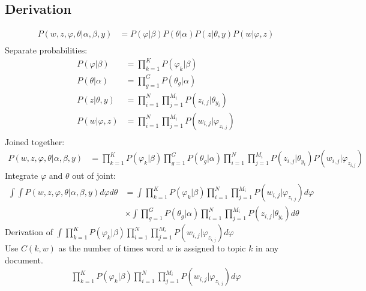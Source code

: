 \subsection{Derivation}\label{ref:derivation}
\begin{align}
P(w, z, \varphi, \theta | \alpha, \beta, y) &= P(\varphi | \beta)P(\theta | \alpha)P(z | \theta, y)P(w | \varphi, z)\\
\end{align}
Separate probabilities:
\begin{align}
P(\varphi | \beta) &= \prod\limits_{k=1}^K P(\varphi_k|\beta)\\
P(\theta | \alpha) &= \prod\limits_{g=1}^G P(\theta_g|\alpha)\\
P(z | \theta, y) &= \prod\limits_{i=1}^N \prod\limits_{j=1}^{M_i} P(z_{i,j}|\theta_{y_i})\\
P(w | \varphi, z) &= \prod\limits_{i=1}^N \prod\limits_{j=1}^{M_i} P(w_{i,j}|\varphi_{z_{i,j}})\\
\end{align}
Joined together:
\begin{align}
P(w, z, \varphi, \theta | \alpha, \beta, y) &= \prod\limits_{k=1}^K P(\varphi_k|\beta) \prod\limits_{g=1}^G P(\theta_g|\alpha) \prod^N_{i=1}\prod^{M_i}_{j=1} P(z_{i,j}|\theta_{y_i}) P(w_{i,j}|\varphi_{z_{i,j}})
\end{align}
Integrate $\varphi$ and $\theta$ out of joint:
\begin{align}
\int \int P(w, z, \varphi, \theta | \alpha, \beta, y) d\varphi d\theta &= \int \prod\limits_{k=1}^K P(\varphi_k|\beta) \prod^N_{i=1}\prod^{M_i}_{j=1} P(w_{i,j}|\varphi_{z_{i,j}}) d\varphi\\
&\times \int \prod\limits_{g=1}^G P(\theta_g|\alpha) \prod^N_{i=1}\prod^{M_i}_{j=1} P(z_{i,j}|\theta_{y_i}) d\theta
\end{align}
Derivation of $\int \prod\limits_{k=1}^K P(\varphi_k|\beta) \prod^N_{i=1}\prod^{M_i}_{j=1} P(w_{i,j}|\varphi_{z_{i,j}}) d\varphi$
~\\Use $C(k,w)$ as the number of times word $w$ is assigned to topic $k$ in any document.
\begin{align}
\prod\limits_{k=1}^K P(\varphi_k|\beta) \prod^N_{i=1}\prod^{M_i}_{j=1} P(w_{i,j}|\varphi_{z_{i,j}}) d\varphi
\end{align}

